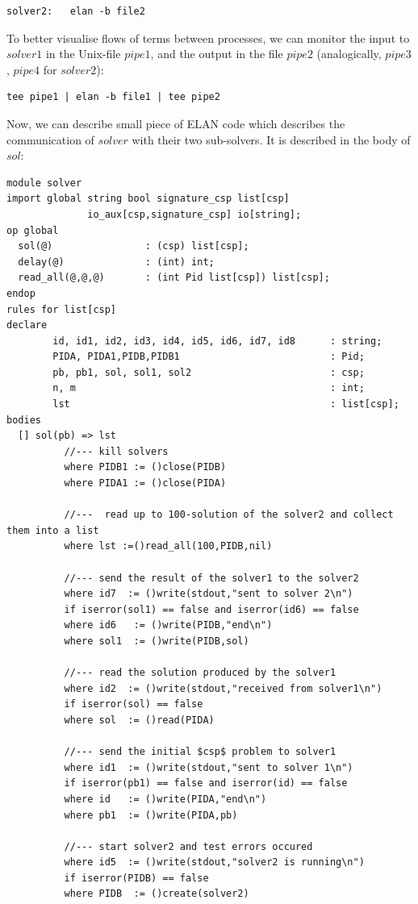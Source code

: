 \documentclass{article}
\begin{document}
{{\begin{verbatim}
solver2:   elan -b file2 
\end{verbatim}
}
%
To better visualise flows of terms between processes, we can
monitor the input to $solver1$ in the Unix-file $pipe1$,
and the output in the file $pipe2$ (analogically, $pipe3$, $pipe4$ for
$solver2$):
{\scriptsize
\begin{verbatim}
tee pipe1 | elan -b file1 | tee pipe2
\end{verbatim}
}
%
Now, we can describe small piece of ELAN code which describes the 
communication of $solver$ with their two sub-solvers. It is described
in the body of $sol$:
{\scriptsize
\begin{verbatim}
module solver
import global string bool signature_csp list[csp]
              io_aux[csp,signature_csp] io[string];
op global
  sol(@)                : (csp) list[csp];
  delay(@)              : (int) int;
  read_all(@,@,@)       : (int Pid list[csp]) list[csp];
endop
rules for list[csp]
declare 
        id, id1, id2, id3, id4, id5, id6, id7, id8      : string;
        PIDA, PIDA1,PIDB,PIDB1                          : Pid;
        pb, pb1, sol, sol1, sol2                        : csp;
        n, m                                            : int;
        lst                                             : list[csp];
bodies
  [] sol(pb) => lst
          //--- kill solvers
          where PIDB1 := ()close(PIDB)
          where PIDA1 := ()close(PIDA)

          //---  read up to 100-solution of the solver2 and collect them into a list
          where lst :=()read_all(100,PIDB,nil)  
          
          //--- send the result of the solver1 to the solver2
          where id7  := ()write(stdout,"sent to solver 2\n")
          if iserror(sol1) == false and iserror(id6) == false 
          where id6   := ()write(PIDB,"end\n")
          where sol1  := ()write(PIDB,sol)

          //--- read the solution produced by the solver1
          where id2  := ()write(stdout,"received from solver1\n")
          if iserror(sol) == false
          where sol  := ()read(PIDA)

          //--- send the initial $csp$ problem to solver1
          where id1  := ()write(stdout,"sent to solver 1\n")
          if iserror(pb1) == false and iserror(id) == false 
          where id   := ()write(PIDA,"end\n")
          where pb1  := ()write(PIDA,pb)

          //--- start solver2 and test errors occured
          where id5  := ()write(stdout,"solver2 is running\n")
          if iserror(PIDB) == false 
          where PIDB  := ()create(solver2)


\end{verbatim}}}
\end{document}
